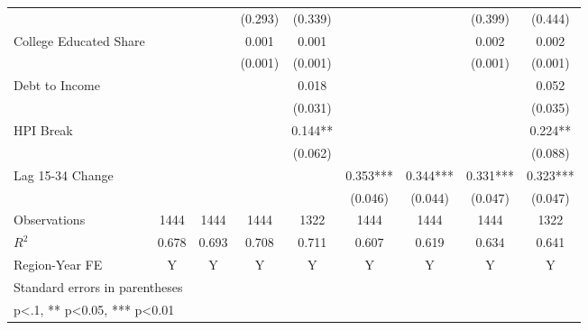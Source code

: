 \begin{table}[htbp]
\begin{tabular}{l*{8}{c}}
                    &            &            &  (0.293)   &  (0.339)   &            &            &  (0.399)   &  (0.444)   \\
\addlinespace
College Educated Share&            &            &    0.001   &    0.001   &            &            &    0.002   &    0.002   \\
                    &            &            &  (0.001)   &  (0.001)   &            &            &  (0.001)   &  (0.001)   \\
\addlinespace
Debt to Income      &            &            &            &    0.018   &            &            &            &    0.052   \\
                    &            &            &            &  (0.031)   &            &            &            &  (0.035)   \\
\addlinespace
HPI Break           &            &            &            &    0.144** &            &            &            &    0.224** \\
                    &            &            &            &  (0.062)   &            &            &            &  (0.088)   \\
\addlinespace
Lag 15-34 Change    &            &            &            &            &    0.353***&    0.344***&    0.331***&    0.323***\\
                    &            &            &            &            &  (0.046)   &  (0.044)   &  (0.047)   &  (0.047)   \\
\midrule
Observations        &     1444   &     1444   &     1444   &     1322   &     1444   &     1444   &     1444   &     1322   \\
\(R^{2}\)           &    0.678   &    0.693   &    0.708   &    0.711   &    0.607   &    0.619   &    0.634   &    0.641   \\
Region-Year FE      &        Y   &        Y   &        Y   &        Y   &        Y   &        Y   &        Y   &        Y   \\
\bottomrule
\multicolumn{9}{l}{\footnotesize Standard errors in parentheses}\\
\multicolumn{9}{l}{\footnotesize * p<.1, ** p<0.05, *** p<0.01}\\
\end{tabular}
\end{table}
